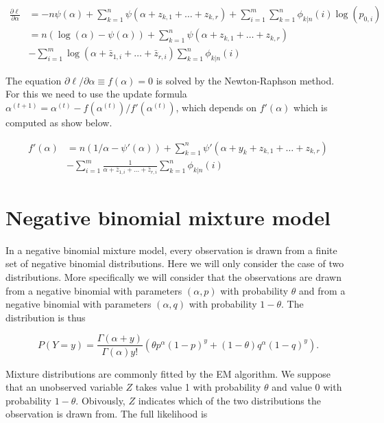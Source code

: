 \documentclass[12pt]{article}
\begin{document}
\begin{appendices}
    \begin{align}
      \frac{\partial \ell}{\partial \alpha}
      &= -n\psi(\alpha) + \sum_{k=1}^n 
      \psi(\alpha+z_{k,1}+\dots+z_{k,r})
      +\sum_{i=1}^m\sum_{k=1}^n \phi_{k|n}(i) \log(p_{0,i}) \nonumber \\
      &= n(\log(\alpha) - \psi(\alpha)) + \sum_{k=1}^n
      \psi(\alpha+z_{k,1}+\dots+z_{k,r}) \nonumber \\
      &- \sum_{i=1}^m \log(\alpha + \bar{z}_{1,i} +
      \ldots + \bar{z}_{r,i}) \sum_{k=1}^n\phi_{k|n}(i)
\label{lalpha}
    \end{align}

    The equation $\partial \ell / \partial \alpha \equiv f(\alpha) = 0$
    is solved by the Newton-Raphson method. For this we need to
    use the update formula
    $\alpha^{(t+1)} = \alpha^{(t)} - f(\alpha^{(t)})/f'(\alpha^{(t)})$,
    which depends on $f'(\alpha)$ which is computed as show below.
  
    \begin{align*}
    f'(\alpha) &= n\left(1/\alpha-\psi'(\alpha) \right) +
      \sum_{k=1}^n\psi'(\alpha+y_k+z_{k,1}+\ldots+ z_{k,r}) \\
      &- \sum_{i=1}^m \frac{1}{\alpha + \bar{z}_{1,i} +
      \ldots + \bar{z}_{r,i}} \sum_{k=1}^n\phi_{k|n}(i)
    \end{align*}

  \section{Negative binomial mixture model}
\label{mixture}

    In a negative binomial mixture model, every observation is drawn
    from a finite set of negative binomial distributions. Here we
    will only consider the case of two distributions. More specifically
    we will consider that the observations are drawn from a negative
    binomial with parameters $(\alpha, p)$ with probability $\theta$
    and from a negative binomial with parameters $(\alpha, q)$
    with probability $1-\theta$. The distribution is thus

    \begin{equation}
    P(Y = y) = \frac{\Gamma(\alpha+y)}{\Gamma(\alpha)y!}
    \left(\theta p^{\alpha}(1-p)^y + (1-\theta)q^{\alpha}(1-q)^y\right).
    \end{equation}

    Mixture distributions are commonly fitted by the EM algorithm.
    We suppose that an unobserved variable $Z$ takes value 1 with
    probability $\theta$ and value 0 with probability $1-\theta$.
    Obivously, $Z$ indicates which of the two distributions the
    observation is drawn from. The full likelihood is 


\end{appendices}
\end{document}

